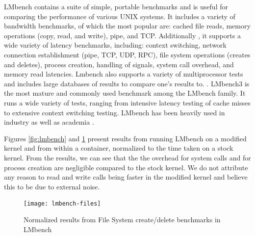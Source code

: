 LMbench contains a suite of simple, portable benchmarks and is useful for comparing the performance of various UNIX systems.  It includes a variety of bandwidth benchmarks, of which the most popular are: cached file reads, memory operations (copy, read, and write), pipe, and TCP.  Additionally , it supports a wide variety of latency benchmarks, including: context switching, network connection establishment (pipe, TCP, UDP, RPC), file system operations (creates and deletes), process creation, handling of signals, system call overhead, and memory read latencies.  Lmbench also supports a variety of multiprocessor tests and includes large databases of results to compare one's results to. \cite{lmbench_paper}. LMbench3 is the most mature and commonly used benchmark among the LMbench family.  It runs a wide variety of tests, ranging from intensive latency testing of cache misses to extensive context switching testing.  LMbench has been heavily used in industry as well as academia \cite{lmbench}.

Figures \ref{fig:lmbench} and \ref{fig:lmbench-files} present results from running LMbench on a modified kernel and from within a container, normalized to the time taken on a stock kernel.  From the results, we can see that the the overhead for system calls and for process creation are negligible compared to the stock kernel. We do not attribute any reason to read and write calls being faster in the modified kernel and believe this to be due to external noise. 

\begin{figure}[bth]
\centering
\texttt{[image: lmbench-files]}
\caption{Normalized results from File System create/delete benchmarks in LMbench}
\label{fig:lmbench-files}
\end{figure}

